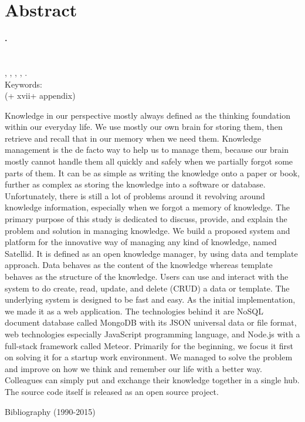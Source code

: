 
\begingroup
\let\clearpage\relax
\let\cleardoublepage\relax

\label{chap:abstract}
\chapter{Abstract}

\textbf{\myName.} \myNPM \\
\textbf{\myTitle} \\
\myDepTitle \\
\myThesisType, \myDepartmentLong, \myFacultyLong, \myUni, \myYear. \\
Keywords: \myKeywords \\
(+ xvii+ appendix)

\hfill

\singlespacing

Knowledge in our perspective mostly always defined as the thinking foundation within our everyday life.
We use mostly our own brain for storing them, then retrieve and recall that in our memory when we need them.
Knowledge management is the de facto way to help us to manage them, because our brain mostly cannot handle them all quickly and safely when we partially forgot some parts of them.
It can be as simple as writing the knowledge onto a paper or book, further as complex as storing the knowledge into a software or database.
Unfortunately, there is still a lot of problems around it revolving around knowledge information, especially when we forgot a memory of knowledge.
The primary purpose of this study is dedicated to discuss, provide, and explain the problem and solution in managing knowledge.
We build a proposed system and platform for the innovative way of managing any kind of knowledge, named Satellid.
It is defined as an open knowledge manager, by using data and template approach.
Data behaves as the content of the knowledge whereas template behaves as the structure of the knowledge.
Users can use and interact with the system to do create, read, update, and delete (CRUD) a data or template.
The underlying system is designed to be fast and easy.
As the initial implementation, we made it as a web application.
The technologies behind it are NoSQL document database called MongoDB with its JSON universal data or file format, web technologies especially JavaScript programming language, and Node.js with a full-stack framework called Meteor.
Primarily for the beginning, we focus it first on solving it for a startup work environment.
We managed to solve the problem and improve on how we think and remember our life with a better way.
Colleagues can simply put and exchange their knowledge together in a single hub.
The source code itself is released as an open source project.

\onehalfspacing

\hfill


\noindent Bibliography (1990-2015)



\endgroup

\vfill
